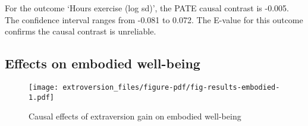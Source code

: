 \documentclass[
  singlecolumn]{report}
\begin{document}
For the outcome `Hours exercise (log sd)', the PATE causal contrast is
-0.005. The confidence interval ranges from -0.081 to 0.072. The E-value
for this outcome confirms the causal contrast is unreliable.

\hypertarget{effects-on-embodied-well-being}{%
\subsection{Effects on embodied
well-being}\label{effects-on-embodied-well-being}}

\begin{figure}

{\centering \texttt{[image: extroversion\_files/figure-pdf/fig-results-embodied-1.pdf]}

}

\caption{\label{fig-results-embodied}Causal effects of extraversion gain
on embodied well-being}

\end{figure}
\end{document}
